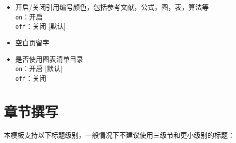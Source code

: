 \begin{itemize}[leftmargin=3cm]
  \item[{\tt  $\backslash$refcolor} $\triangleright$]  开启/关闭引用编号颜色，包括参考文献，公式，图，表，算法等\\
  \texttt{on}：开启\\
  \texttt{off}：关闭 [默认]
  \item[{\tt $\backslash$emptypageword} $\triangleright$]  空白页留字
  \item[{\tt $\backslash$Listfigtab} $\triangleright$]  是否使用图表清单目录\\
  \texttt{on}：开启 [默认]\\
  \texttt{off}：关闭
\end{itemize}

\section{章节撰写}
本模板支持以下标题级别，一般情况下不建议使用三级节和更小级别的标题：

